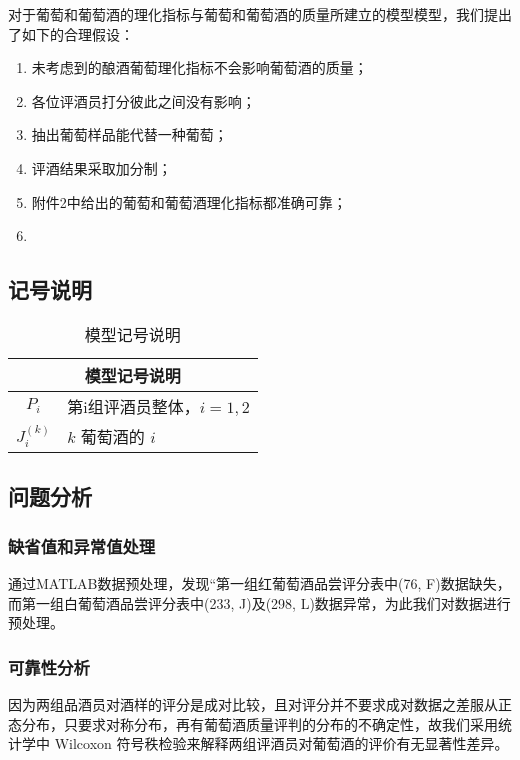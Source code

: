 \documentclass[nocover]{cumcmart}%
\begin{document}
    对于葡萄和葡萄酒的理化指标与葡萄和葡萄酒的质量所建立的模型模型，我们提出了如下的合理假设：
    \begin{enumerate}
        \item 未考虑到的酿酒葡萄理化指标不会影响葡萄酒的质量；
        \item 各位评酒员打分彼此之间没有影响；
        \item 抽出葡萄样品能代替一种葡萄；
        \item 评酒结果采取加分制；
        \item 附件2中给出的葡萄和葡萄酒理化指标都准确可靠；
        \item 
    \end{enumerate}

    \subsection{记号说明}

    \begin{table}[!htbp]
        \centering
        \begin{tabular}{cl}
        \toprule
        \multicolumn{2}{c}{\large 模型记号说明}\\
        \midrule
            ${P_i}$         &   第i组评酒员整体，${i = 1,2}$    \\
            ${J_{i}^{(k)}}$ &   $k$ 葡萄酒的 $i$   \\ 
            

        \bottomrule
        \end{tabular}
        \caption{模型记号说明}
    \end{table}

    \subsection{问题分析}

        \subsubsection{缺省值和异常值处理}
        通过MATLAB数据预处理，发现“第一组红葡萄酒品尝评分表中(76, F)数据缺失，而第一组白葡萄酒品尝评分表中(233, J)及(298, L)数据异常，为此我们对数据进行预处理。

        \subsubsection{可靠性分析}
        因为两组品酒员对酒样的评分是成对比较，且对评分并不要求成对数据之差服从正态分布，只要求对称分布，再有葡萄酒质量评判的分布的不确定性，故我们采用统计学中 Wilcoxon 符号秩检验来解释两组评酒员对葡萄酒的评价有无显著性差异。
\end{document}
